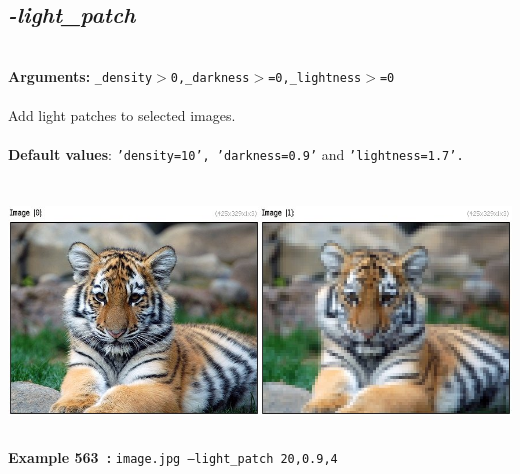 \documentclass[a4paper,11pt,twoside]{book}
\begin{document}
\subsection{\emph{-light\_patch} }\vspace*{-0.5em}
~\\\textbf{Arguments: } 
{\small \texttt{\_density$>$0,\_darkness$>$=0,\_lightness$>$=0}}\\~\\
Add light patches to selected images.
~\\~\\\textbf{Default values}: {\small \texttt{'density=10', 'darkness=0.9'} and \texttt{'lightness=1.7'.}}
\begin{center}\includegraphics[keepaspectratio=true,height=7cm,width=\textwidth]{img/gmic_def563.jpg}\\
{\footnotesize \textbf{Example 563~:} \texttt{image.jpg --light\_patch 20,0.9,4}}
\end{center}
\end{document}
